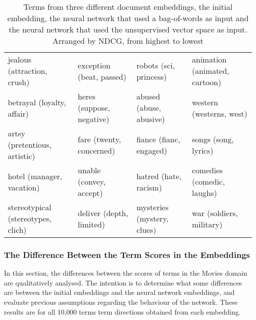 \begin{table}[]
\begin{tabular}{L{3.8cm}L{3.8cm}L{3.8cm}L{3.8cm}}
jealous (attraction, crush)          & exception (beat, passed)                    & robots (sci, princess)                 & animation (animated, cartoon)              \\
betrayal (loyalty, affair)           & heres (suppose, negative)                   & abused (abuse, abusive)                & western (westerns, west)                   \\
artsy (pretentious, artistic)        & fare (twenty, concerned)                    & fiance (fianc, engaged)                & songs (song, lyrics)                       \\
hotel (manager, vacation)            & unable (convey, accept)                     & hatred (hate, racism)                  & comedies (comedic, laughs)                 \\
stereotypical (stereotypes, clich)   & deliver (depth, limited)                    & mysteries (mystery, clues)             & war (soldiers, military)                   \\                                   
	\end{tabular}\caption{Terms from three different document embeddings, the initial embedding, the neural network that used a bag-of-words as input and the neural network that used the unsupervised vector space as input. Arranged by NDCG, from highest to lowest}
\end{table}


\subsubsection{The Difference Between the Term Scores in the Embeddings}\label{ch5:diffsection}

In this section, the differences between the scores of terms in the Movies domain are qualitatively analysed. The intention is to determine what some differences are between the initial embeddings and the neural network embeddings, and evaluate previous assumptions regarding the behaviour of the network. These results are for all 10,000 terms term directions obtained from each embedding. 

